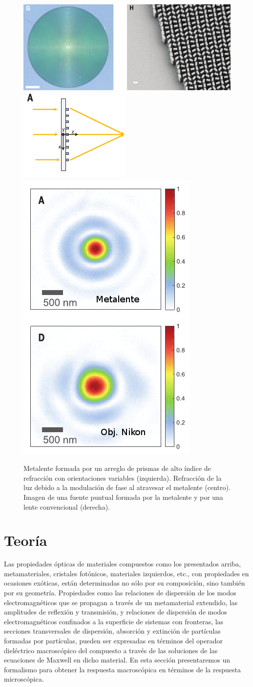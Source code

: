 \documentclass[12pt]{article}
\begin{document}
\begin{figure}
  \centering
  \includegraphics[width=.5\textwidth,angle=90, valign=c]{fig13a}
  \includegraphics[height=.3\textwidth,valign=c]{fig13b}
  \includegraphics[height=.5\textwidth,valign=c]{fig13c}
\caption{Metalente formada por un arreglo de prismas de alto índice
    de refracción con orientaciones variables (izquierda). Refracción
    de la luz debido a la modulación de fase al atravesar el metalente
    (centro). Imagen de una
    fuente puntual formada por la metalente y por una lente
    convencional (derecha). }
  \label{fig:metalente}
\end{figure}


\section{Teoría}

Las propiedades ópticas de materiales compuestos como los presentados
arriba, metamateriales, cristales fotónicos, materiales izquierdos,
etc., con propiedades en ocasiones exóticas, están determinadas no
sólo por su composición, sino también por su geometría. Propiedades
como las relaciones de dispersión de los modos electromagnéticos que
se propagan a través de un metamaterial extendido, las amplitudes de
reflexión y transmisión, y relaciones de dispersión de modos
electromagnéticos confinados a la superficie de sistemas con
fronteras, las secciones transversales de dispersión, absorción y
extinción de partículas formadas por partículas, pueden ser expresadas
en términos del operador dieléctrico macroscópico del compuesto a
través de las soluciones de las ecuaciones de Maxwell en dicho
material. En esta sección presentaremos un formalismo para obtener la
respuesta macroscópica en términos de la respuesta microscópica.
\end{document}
